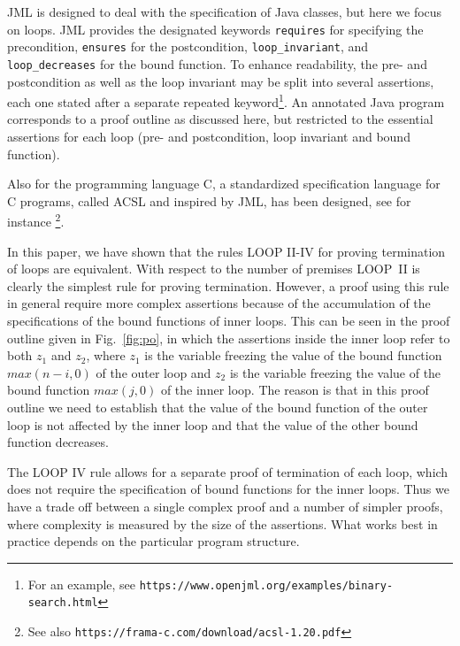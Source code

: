 \documentclass[manuscript, screen, review]{acmart}
\begin{document}
JML is designed to deal with the specification of Java classes,
but here we focus on loops.
JML provides the designated keywords 
\texttt{requires} for specifying the precondition,
\texttt{ensures} for the postcondition,
\texttt{loop\_invariant}, and 
\texttt{loop\_decreases} for the bound function.
To enhance readability, the pre- and postcondition as well as the loop invariant may be split into several
assertions, each one stated after a separate repeated keyword\footnote{For an example, see 
       \texttt{https://www.openjml.org/examples/binary-search.html}}.
An annotated Java program corresponds to a proof outline as discussed here,
but restricted to the essential assertions for each loop (pre- and postcondition,
loop invariant and bound function).

Also for the programming language C, a standardized specification language for C programs, 
called ACSL and inspired by JML, has been designed, see for instance
\cite{BBBCKKMPPS21}\footnote{See also
       \texttt{https://frama-c.com/download/acsl-1.20.pdf}}.


\medskip

In this paper, we have shown that  the rules LOOP II-IV 
for proving termination of loops are equivalent.
With respect to the number of premises LOOP~II is clearly
the simplest rule for proving termination.
However,  a proof using this rule in general require more
complex assertions because of the accumulation of the
specifications of the bound functions of  inner loops.
This can be seen in the proof outline given in Fig.~\ref{fig:po}, 
in which the assertions inside the inner loop refer to both $z_1$ and $z_2$,
where $z_1$ is the variable freezing the value of the bound function $max(n-i,0)$ of the outer loop
and $z_2$ is the variable freezing the value of the bound function $max(j,0)$ of the inner loop.
The reason is that in this proof outline we need to establish 
that the value of the bound function of the outer loop is not affected 
by the inner loop and that the value of the other bound function decreases.

The LOOP IV rule allows for a separate proof of termination of each
loop, which does not require the specification of bound functions for
the inner loops.  Thus we have a trade off between a single complex
proof and a number of simpler proofs, where complexity is measured by
the size of the assertions.  What works best in practice depends on
the particular program structure.
\end{document}

